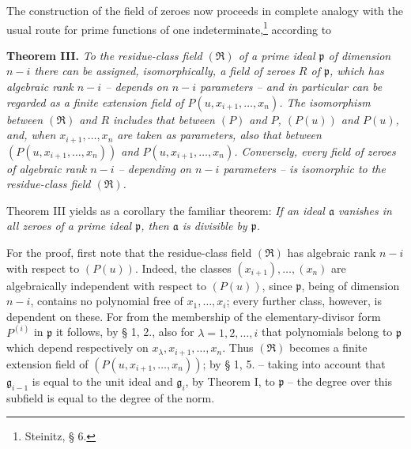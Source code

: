 \documentclass[11pt]{article}
\providecommand{\mR}{\mathfrak{R}}
\providecommand{\frakp}{\mathfrak p}
\providecommand{\fraka}{\mathfrak a}
\providecommand{\frakg}{\mathfrak g}
\providecommand{\mR}{\mathfrak{R}}
\providecommand{\fraka}{\mathfrak a}
\providecommand{\frakp}{\mathfrak p}
\providecommand{\frakp}{\mathfrak p}
\begin{document}
The construction of the field of zeroes now proceeds in complete analogy with the usual route for prime functions of one indeterminate,\footnote{Steinitz, § 6.} according to

\textbf{Theorem III.} \emph{To the residue-class field $(\mR)$ of a prime ideal $\frakp$ of dimension $n-i$ there can be assigned, isomorphically, a field of zeroes $R$ of $\frakp$, which has algebraic rank $n-i$ -- depends on $n-i$ parameters -- and in particular can be regarded as a finite extension field of $P(u,x_{i+1},\ldots,x_n)$. The isomorphism between $(\mR)$ and $R$ includes that between $(P)$ and $P$, $(P(u))$ and $P(u)$, and, when $x_{i+1},\ldots,x_n$ are taken as parameters, also that between $(P(u,x_{i+1},\ldots,x_n))$ and $P(u,x_{i+1},\ldots,x_n)$. Conversely, every field of zeroes of algebraic rank $n-i$ -- depending on $n-i$ parameters -- is isomorphic to the residue-class field $(\mR)$.}

Theorem III yields as a corollary the familiar theorem: \emph{If an ideal $\fraka$ vanishes in all zeroes of a prime ideal $\frakp$, then $\fraka$ is divisible by $\frakp$.}

For the proof, first note that the residue-class field $(\mR)$ has algebraic rank $n-i$ with respect to $(P(u))$. Indeed, the classes $(x_{i+1}),\ldots,(x_n)$ are algebraically independent with respect to $(P(u))$, since $\frakp$, being of dimension $n-i$, contains no polynomial free of $x_1,\ldots,x_i$; every further class, however, is dependent on these. For from the membership of the elementary-divisor form $P^{(i)}$ in $\frakp$ it follows, by § 1, 2., also for $\lambda=1,2,\ldots,i$ that polynomials belong to $\frakp$ which depend respectively on $x_\lambda,x_{i+1},\ldots,x_n$. Thus $(\mR)$ becomes a finite extension field of $(P(u,x_{i+1},\ldots,x_n))$; by § 1, 5. -- taking into account that $\frakg_{i-1}$ is equal to the unit ideal and $\frakg_i$, by Theorem I, to $\frakp$ -- the degree over this subfield is equal to the degree of the norm.
\end{document}

